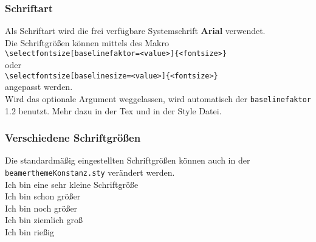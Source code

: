 \documentclass[rgb]{beamer}
\begin{document}
\begin{frame}[t]
	\frametitle{Schriftart}
	Als Schriftart wird die frei verfügbare Systemschrift \textbf{Arial} verwendet.\\
	\vskip 18pt
	Die Schriftgrößen können mittels des Makro\\
	\texttt{\textbackslash selectfontsize[baselinefaktor=<value>]\{<fontsize>\}}\\
    oder\\
    	\texttt{\textbackslash selectfontsize[baselinesize=<value>]\{<fontsize>\}}\\
	angepasst werden.\\[\baselineskip]
	Wird das optionale Argument weggelassen, wird automatisch der \texttt{baselinefaktor} 1.2 benutzt. Mehr dazu in der Tex und in der Style Datei.
\end{frame}


%
%
%
%
%
% 
%
%
%
%                    
%
%

\begin{frame}[t]
	\frametitle{Verschiedene Schriftgrößen}
	Die standardmäßig eingestellten Schriftgrößen können auch in der \texttt{beamerthemeKonstanz.sty} verändert werden.\\[\baselineskip]
	 Ich bin eine sehr kleine Schriftgröße\\
	 Ich bin schon größer\\
	 Ich bin noch größer\\
	 Ich bin ziemlich groß\\
	 Ich bin rießig\\
\end{frame}
\end{document}
